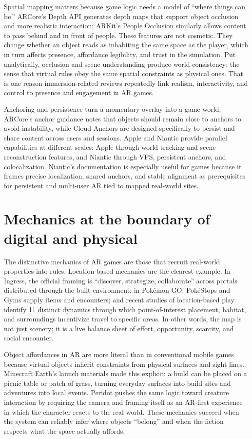 \begin{sloppy}
Spatial mapping matters because game logic needs a model of ``where things can be.'' ARCore's Depth API generates depth maps that support object occlusion and more realistic interaction; ARKit's People Occlusion similarly allows content to pass behind and in front of people. These features are not cosmetic. They change whether an object reads as inhabiting the same space as the player, which in turn affects presence, affordance legibility, and trust in the simulation. Put analytically, occlusion and scene understanding produce world-consistency: the sense that virtual rules obey the same spatial constraints as physical ones. That is one reason immersion-related reviews repeatedly link realism, interactivity, and control to presence and engagement in AR games.

Anchoring and persistence turn a momentary overlay into a game world. ARCore's anchor guidance notes that objects should remain close to anchors to avoid instability, while Cloud Anchors are designed specifically to persist and share content across users and sessions. Apple and Niantic provide parallel capabilities at different scales: Apple through world tracking and scene reconstruction features, and Niantic through VPS, persistent anchors, and colocalization. Niantic's documentation is especially useful for games because it frames precise localization, shared anchors, and stable alignment as prerequisites for persistent and multi-user AR tied to mapped real-world sites.

\section*{Mechanics at the boundary of digital and physical}
The distinctive mechanics of AR games are those that recruit real-world properties into rules. Location-based mechanics are the clearest example. In Ingress, the official framing is ``discover, strategize, collaborate'' across portals distributed through the built environment; in Pokémon GO, PokéStops and Gyms supply items and encounters; and recent studies of location-based play identify 11 distinct dynamics through which point-of-interest placement, habitat, and surroundings incentivize travel to specific areas. In other words, the map is not just scenery; it is a live balance sheet of effort, opportunity, scarcity, and social encounter.

Object affordances in AR are more literal than in conventional mobile games because virtual objects inherit constraints from physical surfaces and sight lines. Minecraft Earth's launch materials made this explicit: a build can be placed on a picnic table or patch of grass, turning everyday surfaces into build sites and adventures into local events. Peridot pushes the same logic toward creature interaction by requiring the camera and framing itself as an AR-first experience in which the character reacts to the real world. These mechanics succeed when the system can reliably infer where objects ``belong'' and when the fiction respects what the space actually affords.


\end{sloppy}
